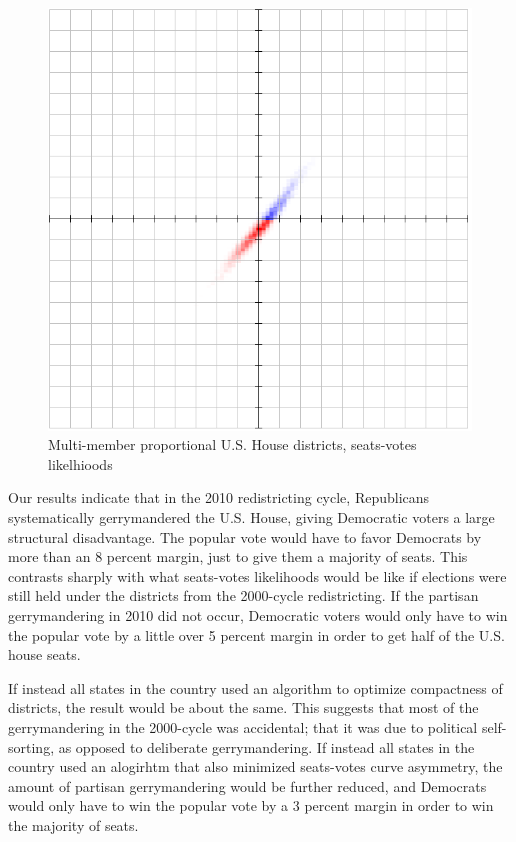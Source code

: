 \documentclass[preprint,12pt]{article}
\begin{document}
\begin{figure}[htb!]
    \begin{center}
        \includegraphics[scale=0.5]{Figures/original_method/FV_droop_ush.png}
        \caption{Multi-member proportional U.S. House districts, seats-votes likelhioods}\label{fig:FV_ush}
    \end{center}
\end{figure}

Our results indicate that in the 2010 redistricting cycle, Republicans systematically gerrymandered the U.S. House, giving Democratic voters a large structural disadvantage. The popular vote would have to favor Democrats by more than an 8 percent margin, just to give them a majority of seats.  This contrasts sharply with what seats-votes likelihoods would be like if elections were still held under the districts from the 2000-cycle redistricting.  If the partisan gerrymandering in 2010 did not occur, Democratic voters would only have to win the popular vote by a little over 5 percent margin in order to get half of the U.S. house seats.

If instead all states in the country used an algorithm to optimize compactness of districts, the result would be about the same.  This suggests that most of the gerrymandering in the 2000-cycle was accidental; that it was due to political self-sorting, as opposed to deliberate gerrymandering.  If instead all states in the country used an alogirhtm that also minimized seats-votes curve asymmetry, the amount of partisan gerrymandering would be further reduced, and Democrats would only have to win the popular vote by a 3 percent margin in order to win the majority of seats.
\end{document}
